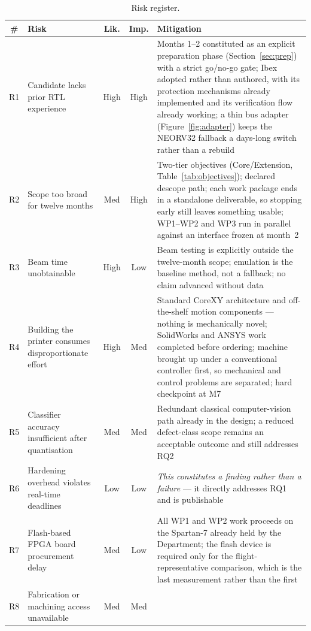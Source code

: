 \documentclass[11pt,a4paper]{article}
\begin{document}
\begin{table}[htbp]
\centering
\caption{Risk register.}
\label{tab:risks}
\small
\begin{tabularx}{\textwidth}{@{}c L{3.6cm} c c X@{}}
\toprule
\textbf{\#} & \textbf{Risk} & \textbf{Lik.} & \textbf{Imp.} & \textbf{Mitigation} \\
\midrule
R1 & Candidate lacks prior RTL experience & High & High &
Months 1--2 constituted as an explicit preparation phase
(Section~\ref{sec:prep}) with a strict go/no-go gate; Ibex adopted rather than
authored, with its protection mechanisms already implemented and its verification
flow already working; a thin bus adapter (Figure~\ref{fig:adapter}) keeps the
NEORV32 fallback a days-long switch rather than a rebuild \\
R2 & Scope too broad for twelve months & Med & High &
Two-tier objectives (Core/Extension, Table~\ref{tab:objectives}); declared
descope path; each work package ends in a standalone deliverable, so stopping
early still leaves something usable; WP1--WP2 and WP3 run in parallel against an
interface frozen at month~2 \\
R3 & Beam time unobtainable & High & Low &
Beam testing is explicitly outside the twelve-month scope; emulation is the
baseline method, not a fallback; no claim advanced without data \\
R4 & Building the printer consumes disproportionate effort & High & Med &
Standard CoreXY architecture and off-the-shelf motion components --- nothing is
mechanically novel; SolidWorks and ANSYS work completed before ordering; machine
brought up under a conventional controller first, so mechanical and control
problems are separated; hard checkpoint at M7 \\
R5 & Classifier accuracy insufficient after quantisation & Med & Med &
Redundant classical computer-vision path already in the design; a reduced
defect-class scope remains an acceptable outcome and still addresses RQ2 \\
R6 & Hardening overhead violates real-time deadlines & Low & Low &
\emph{This constitutes a finding rather than a failure} --- it directly
addresses RQ1 and is publishable \\
R7 & Flash-based FPGA board procurement delay & Med & Low &
All WP1 and WP2 work proceeds on the Spartan-7 already held by the Department;
the flash device is required only for the flight-representative comparison, which
is the last measurement rather than the first \\
R8 & Fabrication or machining access unavailable & Med & Med &

\end{tabularx}
\end{table}
\end{document}
